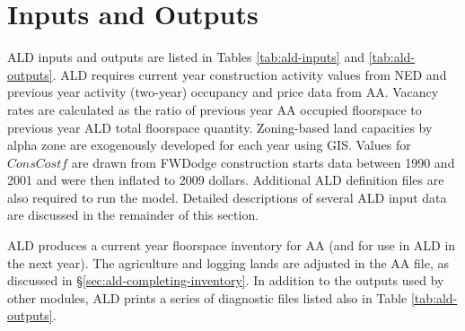 \section{Inputs and Outputs}
ALD inputs and outputs are listed in Tables \ref{tab:ald-inputs} and \ref{tab:ald-outputs}. ALD requires current year construction activity values from NED and previous year activity (two-year) occupancy and price data from AA. Vacancy rates are calculated as the ratio of previous year AA occupied floorspace to previous year ALD total floorspace quantity. Zoning-based land capacities by alpha zone are exogenously developed for each year using GIS. Values for $ConsCostf$ are drawn from FWDodge construction starts data between 1990 and 2001 and were then inflated to 2009 dollars. Additional ALD definition files are also required to run the model. Detailed descriptions of several ALD input data are discussed in the remainder of this section.

ALD produces a current year floorspace inventory for AA (and for use in ALD in the next year). The agriculture and logging lands are adjusted in the AA file, as discussed in \S\ref{sec:ald-completing-inventory}. In addition to the outputs used by other modules, ALD prints a series of diagnostic files listed also in Table \ref{tab:ald-outputs}.

